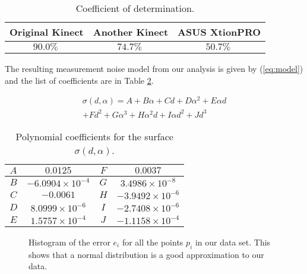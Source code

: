\begin{table}[h!]
\caption{Coefficient of determination.}
\begin{center}
\begin{tabular}{|c|c|c|}
\hline
Original Kinect & Another Kinect & ASUS XtionPRO \\ \hline
$90.0\%\ $ & $74.7\%\ $ & $50.7\%\ $ \\ \hline
\end{tabular}
\end{center}
\label{tab:CD_coefs}
\end{table}

The resulting measurement noise model from our analysis is given by (\ref{eq:model}) and the list of coefficients are in Table \ref{tab:Poly_coefs}.

{\setlength\abovedisplayskip{-4pt} \setlength\belowdisplayskip{-6pt} %
\begin{multline}
\sigma(d,\alpha) = A +  B \alpha  + Cd + D\alpha^2  + E\alpha d \\ +  Fd^2  + G\alpha^3   +H \alpha^2 d   +I\alpha d^2    +Jd^3
\label{eq:model}
\end{multline}
}

\begin{table}[h]
\caption{Polynomial coefficients for the surface $\sigma(d,\alpha)$.}
\begin{center}
\begin{tabular}{|c|c|c|c|}
\hline
$A$ & $0.0125$ & $F$ & $0.0037$ \\ \hline
$B$ & $-6.0904\times 10^{-4}$ & $G$ & $3.4986 \times 10^{-8}$ \\ \hline
$C$ & $-0.0061$ & $H$ & $-3.9492 \times 10^{-6}$ \\ \hline
$D$ & $8.0999\times 10^{-6}$ & $I$ & $-2.7408 \times 10 ^{-6} $ \\ \hline
$E$ & $1.5757 \times 10^{-4}$ & $J$ & $-1.1158 \times 10^{-4}$ \\
\hline
\end{tabular}
\end{center}
\label{tab:Poly_coefs}
\end{table}

\setlength{} 
\setlength{}
\begin{figure}[h]
\centering 
{} 
 
\endpgfgraphicnamed 
\caption{ 
Histogram of the error $e_i$ for all the points $p_i$ in our data set. This shows that a normal distribution is a good approximation to our data.
} 
\label{fig:distancesToPlane}
\end{figure} 

